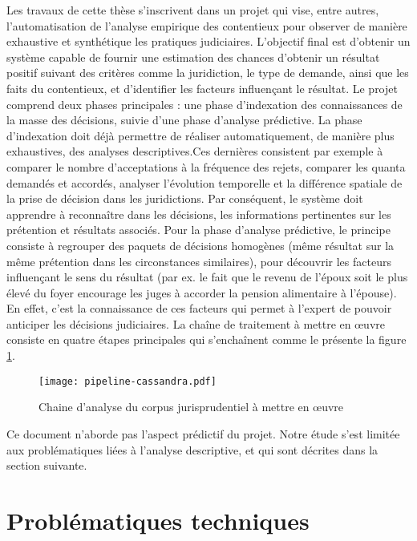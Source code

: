 Les travaux de cette thèse s'inscrivent dans un projet qui vise, entre autres, l'automatisation de l'analyse empirique des contentieux pour observer de manière exhaustive et synthétique les pratiques judiciaires. L'objectif final est d'obtenir un système capable de fournir une estimation des chances d'obtenir un résultat positif suivant des critères comme la juridiction, le type de demande, ainsi que les faits du contentieux, et d'identifier les facteurs influençant le résultat. Le projet comprend deux phases principales : une phase d'indexation des connaissances de la masse des décisions, suivie d'une phase d'analyse prédictive. La phase d'indexation doit déjà permettre de réaliser automatiquement, de manière plus exhaustives, des analyses descriptives.Ces dernières consistent par exemple à comparer le nombre d'acceptations à la fréquence des rejets, comparer les quanta demandés et accordés, analyser l'évolution temporelle et la différence spatiale de la prise de décision dans les juridictions. Par conséquent, le système doit apprendre à reconnaître dans les décisions, les informations pertinentes sur les prétention et résultats associés. Pour la phase d'analyse prédictive, le principe consiste à regrouper des paquets de décisions homogènes (même résultat sur la même prétention dans les circonstances similaires), pour découvrir les facteurs influençant le sens du résultat (par ex. le fait que \og le revenu de l'époux soit le plus élevé du foyer\fg{} encourage les juges à accorder la pension alimentaire à l'épouse). En effet, c'est la connaissance de ces facteurs qui permet à l'expert de pouvoir anticiper les décisions judiciaires. La chaîne de traitement à mettre en \oe uvre consiste en quatre étapes principales qui s'enchaînent comme le présente la figure \ref{fig:intro:pipeline-globale}. 
\begin{figure}
	\texttt{[image: pipeline-cassandra.pdf]}
	\caption{Chaine d'analyse du corpus jurisprudentiel à mettre en \oe uvre} \label{fig:intro:pipeline-globale}
\end{figure} 

Ce document n'aborde pas l'aspect prédictif du projet. Notre étude s'est limitée aux problématiques liées à l'analyse descriptive, et qui sont décrites dans la section suivante.

\section{Problématiques techniques}
\label{sec:intro:probleme}

